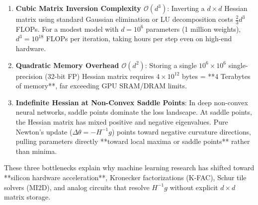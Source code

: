 \begin{enumerate}[leftmargin=*]
    \item \textbf{Cubic Matrix Inversion Complexity $\mathcal{O}(d^3)$}: Inverting a $d \times d$ Hessian matrix using standard Gaussian elimination or LU decomposition costs $\frac{2}{3}d^3$ FLOPs. For a modest model with $d = 10^6$ parameters (1 million weights), $d^3 = 10^{18}$ FLOPs per iteration, taking hours per step even on high-end hardware.
    \item \textbf{Quadratic Memory Overhead $\mathcal{O}(d^2)$}: Storing a single $10^6 \times 10^6$ single-precision (32-bit FP) Hessian matrix requires $4 \times 10^{12}$ bytes = **4 Terabytes of memory**, far exceeding GPU SRAM/DRAM limits.
    \item \textbf{Indefinite Hessian at Non-Convex Saddle Points}: In deep non-convex neural networks, saddle points dominate the loss landscape. At saddle points, the Hessian matrix has mixed positive and negative eigenvalues. Pure Newton's update ($\Delta \theta = -H^{-1}g$) points toward negative curvature directions, pulling parameters directly **toward local maxima or saddle points** rather than minima.
\end{enumerate}

These three bottlenecks explain why machine learning research has shifted toward **silicon hardware acceleration**, Kronecker factorizations (K-FAC), Schur tile solvers (MI2D), and analog circuits that resolve $H^{-1}g$ without explicit $d \times d$ matrix storage.
